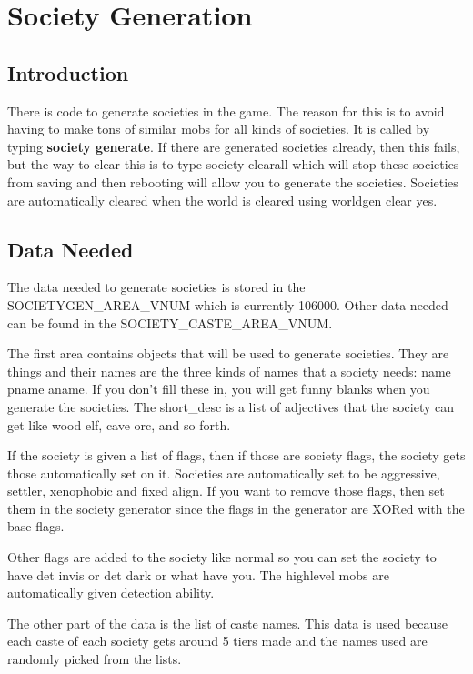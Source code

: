 \chapter{Society Generation}

\section{Introduction}

There is code to generate societies in the game. The reason for this is
to avoid having to make tons of similar mobs for all kinds of societies.
It is called by typing {\bf{society generate}}. If there are generated
societies already, then this fails, but the way to clear this is to type
society clearall which will stop these societies from saving and
then rebooting will allow you to generate the societies. Societies 
are automatically cleared when the world is cleared using worldgen
clear yes.

\section{Data Needed}

The data needed to generate societies is stored in the 
SOCIETYGEN\_AREA\_VNUM which is currently 106000. Other data needed can be
found in the SOCIETY\_CASTE\_AREA\_VNUM. 

The first area contains objects that will be used to generate societies.
They are things and their names are the three kinds of names that
a society needs: name pname aname. If you don't fill these in, you will
get funny blanks when you generate the societies. The short\_desc is
a list of adjectives that the society can get like wood elf, cave orc,
and so forth.

If the society is given a list of flags, then if those are society flags,
the society gets those automatically set on it. Societies are automatically
set to be aggressive, settler, xenophobic and fixed align. If you want
to remove those flags, then set them in the society generator since the
flags in the generator are XORed with the base flags.

Other flags are added to the society like normal so you can set the 
society to have det invis or det dark or what have you. The highlevel
mobs are automatically given detection ability.

The other part of the data is the list of caste names. This data is
used because each caste of each society gets around 5 tiers made
and the names used are randomly picked from the lists.

